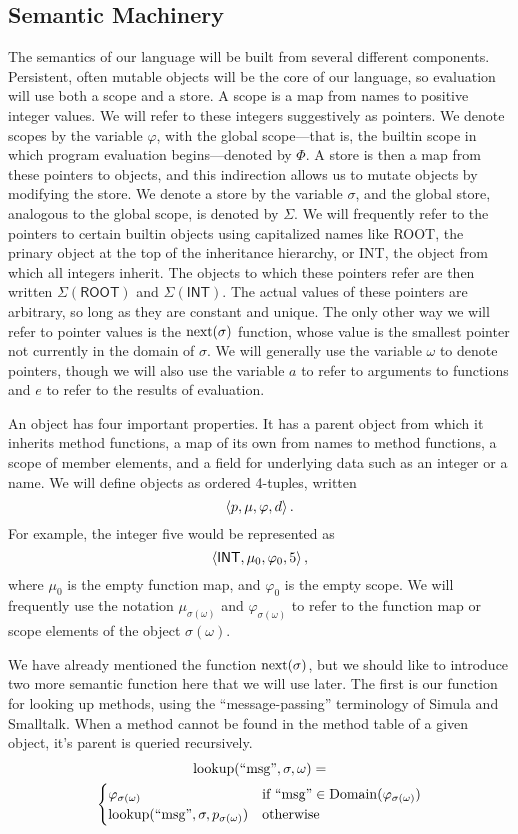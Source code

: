 \documentclass[twocolumn]{article}
\begin{document}
\subsection*{Semantic Machinery}
The semantics of our language will be built from several different
components. Persistent, often mutable objects will be the core of our
language, so evaluation will use both a scope and a store. A scope is
a map from names to positive integer values. We will refer to these
integers suggestively as pointers. We denote scopes by the variable
$\varphi$, with the global scope---that is, the builtin scope in which
program evaluation begins---denoted by $\Phi$. A store is then a map
from these pointers to objects, and this indirection allows us to
mutate objects by modifying the store. We denote a store by the
variable $\sigma$, and the global store, analogous to the global
scope, is denoted by $\Sigma$. We will frequently refer to the
pointers to certain builtin objects using capitalized names like
\textsf{ROOT}, the prinary object at the top of the inheritance
hierarchy, or \textsf{INT}, the object from which all integers
inherit. The objects to which these pointers refer are then written
$\Sigma(\mathsf{ROOT})$ and $\Sigma(\mathsf{INT})$. The actual values
of these pointers are arbitrary, so long as they are constant and
unique. The only other way we will refer to pointer values is the
$\operatorname{next}(\sigma)$ function, whose value is the smallest pointer not
currently in the domain of $\sigma$. We will generally use the
variable $\omega$ to denote pointers, though we will also use the
variable $a$ to refer to arguments to functions and $e$ to refer to
the results of evaluation.

An object has four important properties. It has a parent object from
which it inherits method functions, a map of its own from names to
method functions, a scope of member elements, and a field for
underlying data such as an integer or a name. We will define objects
as ordered 4-tuples, written
\[ \left< p, \mu, \varphi, d \right> .\]
For example, the integer five would be represented as
\[ \left< \mathsf{INT}, \mu_0, \varphi_0, 5 \right>, \]
where $\mu_0$ is the empty function map, and $\varphi_0$ is the empty
scope. We will frequently use the notation $\mu_{\sigma(\omega)}$ and
$\varphi_{\sigma(\omega)}$ to refer to the function map or scope
elements of the object $\sigma(\omega)$.

We have already mentioned the function $\operatorname{next}(\sigma)$, but we should
like to introduce two more semantic function here that we will use
later. The first is our function for looking up methods, using the
``message-passing'' terminology of Simula and Smalltalk. When a method
cannot be found in the method table of a given object, it's parent is
queried recursively.
\begin{multline*} \operatorname{lookup}(\text{``msg''}, \sigma, \omega) = \\
\begin{cases}
  \varphi_{\sigma(\omega)} &\text{if } \text{``msg''} \in
  \operatorname{Domain}(\varphi_{\sigma(\omega)}) \\
    \operatorname{lookup}(\text{``msg''},\sigma,p_{\sigma(\omega)}) &\text{otherwise}
  \end{cases}
\end{multline*}
\end{document}

